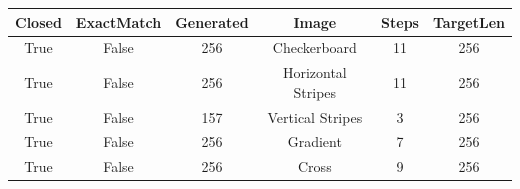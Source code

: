 \begin{table}[h]
\centering
\begin{tabular}{ |c|c|c|c|c|c| }
\hline
Closed & ExactMatch & Generated & Image & Steps & TargetLen \\
\hline
True & False & 256 & Checkerboard & 11 & 256 \\
\hline
True & False & 256 & Horizontal Stripes & 11 & 256 \\
\hline
True & False & 157 & Vertical Stripes & 3 & 256 \\
\hline
True & False & 256 & Gradient & 7 & 256 \\
\hline
True & False & 256 & Cross & 9 & 256 \\
\hline
\end{tabular}
\end{table}
